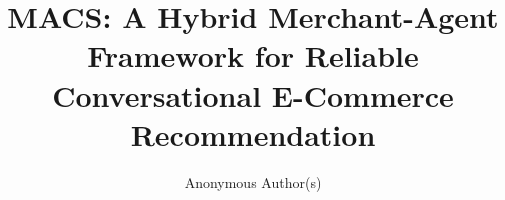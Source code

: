 \documentclass[sigconf,anonymous]{acmart}
\begin{document}
\title[Reliable Conversational Recommendation for Agentic E-Commerce]{
MACS: A Hybrid Merchant-Agent Framework for Reliable Conversational E-Commerce Recommendation
}

\author{Anonymous Author(s)}
\renewcommand{\shortauthors}{Anonymous et al.}
\end{document}
